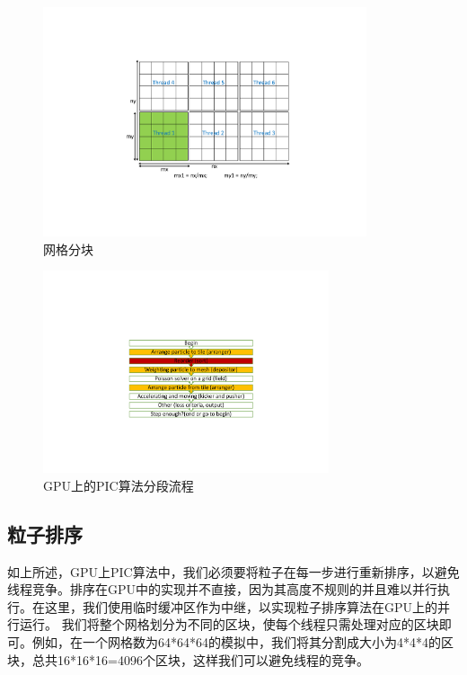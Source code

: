 \begin{figure}[!htb]
    \centering
    \includegraphics[width=0.85\textwidth]{Img/3PIC_tile.pdf}
    \caption{网格分块}
    \label{fig:PIC_tile}
\end{figure}

\begin{figure}[!htb]
    \centering
    \includegraphics[width=0.75\textwidth]{Img/3PIC_flow_reorder.pdf}
    \caption{GPU上的PIC算法分段流程}
    \label{fig:PIC_flow_reorder}
\end{figure}



\subsection{粒子排序}
\label{section:PIC_GPU_reorder}
如上所述，GPU上PIC算法中，我们必须要将粒子在每一步进行重新排序，以避免线程竞争。排序在GPU中的实现并不直接，因为其高度不规则的并且难以并行执行。在这里，我们使用临时缓冲区作为中继，以实现粒子排序算法在GPU上的并行运行。
我们将整个网格划分为不同的区块，使每个线程只需处理对应的区块即可。例如，在一个网格数为64*64*64的模拟中，我们将其分割成大小为4*4*4的区块，总共16*16*16=4096个区块，这样我们可以避免线程的竞争。

